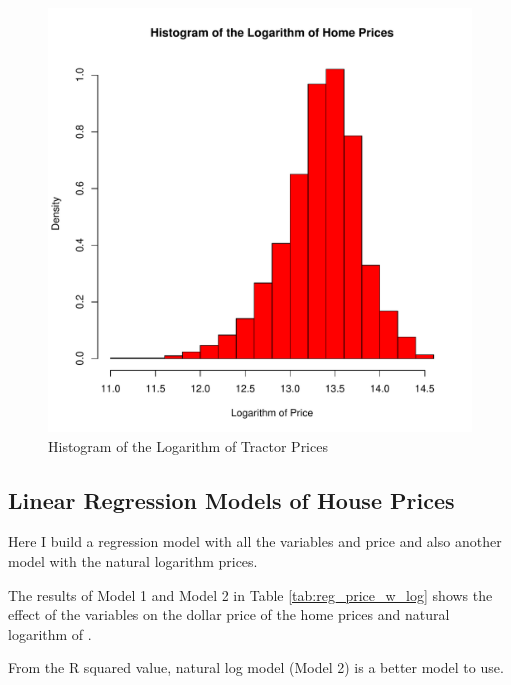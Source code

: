 \begin{figure}[h!]
  \centering
  \includegraphics[scale = 0.5, keepaspectratio=true]{../Figures/hist_log_price}
  \caption{Histogram of the Logarithm of Tractor Prices} \label{fig:hist_log_price}
\end{figure}






\pagebreak
\subsection{Linear Regression Models of House Prices}


Here I build a regression model with all the variables and price and also another model with the natural logarithm prices.



The results of Model 1 and Model 2 in Table \ref{tab:reg_price_w_log}
shows the effect of the variables on the dollar price of the
home prices and natural logarithm of . 

From the R squared value, natural log model (Model 2) is a better model to use.


\clearpage
